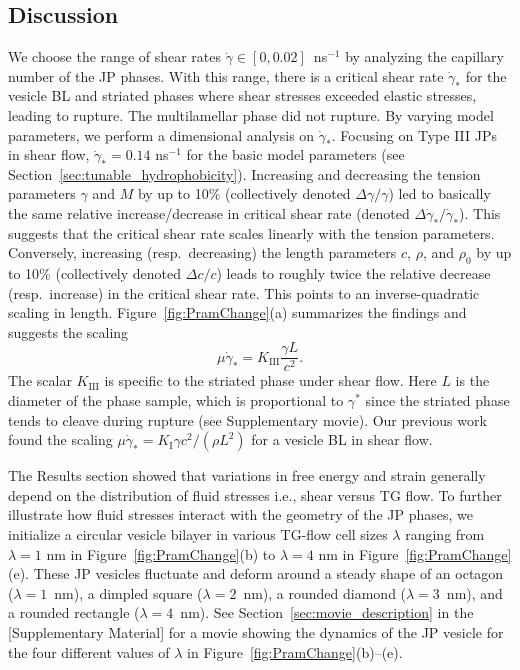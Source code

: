 \documentclass[prb,preprint,showpacs,preprintnumbers,amsmath,amssymb,longbibliography]{revtex4-2}
\begin{document}
\subsection{Discussion}
We choose the range of shear rates $\dot \gamma \in [0, 0.02]$~ns$^{-1}$
by analyzing the capillary number of the JP phases. With this range,
there is a critical shear rate $\dot \gamma_*$ for the vesicle BL and
striated phases where shear stresses exceeded elastic stresses, leading
to rupture. The multilamellar phase did not rupture. By varying model
parameters, we perform a dimensional analysis on $\dot \gamma_*$.
Focusing on Type III JPs in shear flow, $\dot \gamma_* = 0.14$ ns$^{-1}$
for the basic model parameters (see
Section~\ref{sec:tunable_hydrophobicity}). Increasing and decreasing the
tension parameters $\gamma$ and $M$ by up to 10\% (collectively denoted
$\Delta \gamma/\gamma$) led to basically the same relative
increase/decrease in critical shear rate (denoted $\Delta \dot
\gamma_*/\dot \gamma_*$). This suggests that the critical shear rate
scales linearly with the tension parameters. Conversely, increasing
(resp.~decreasing) the length parameters $c$, $\rho$, and $\rho_0$ by up
to 10\% (collectively denoted $\Delta c/c$) leads to roughly twice the
relative decrease (resp.~increase) in the critical shear rate. This
points to an inverse-quadratic scaling in length.
Figure~\ref{fig:PramChange}(a) summarizes the findings and suggests the
scaling
\begin{equation}
\label{eq:CSR}
\mu \dot\gamma_* = K_{\text{III}} \frac{\gamma L}{c^2}.
\end{equation}
The scalar $K_{\text{III}}$ is specific to the striated phase under
shear flow. Here $L$ is the diameter of the phase sample, which is
proportional to $\gamma^*$ since the striated phase tends to cleave
during rupture (see Supplementary movie). Our previous
work~\cite{Fu2022_JFM} found the scaling $\mu \dot\gamma_* =
K_{\text{I}} \gamma c^2/(\rho L^2)$ for a vesicle BL in shear flow.

The Results section showed that variations in free energy and strain
generally depend on the distribution of fluid stresses i.e., shear
versus TG flow. To further illustrate how fluid stresses interact with
the geometry of the JP phases, we initialize a circular vesicle bilayer
in various TG-flow cell sizes $\lambda$ ranging from $\lambda=1$ nm in
Figure~\ref{fig:PramChange}(b) to $\lambda=4$ nm in
Figure~\ref{fig:PramChange}(e).
These JP vesicles fluctuate and deform around a steady shape of an
octagon ($\lambda=1$~nm), a dimpled square ($\lambda=2$~nm), a rounded
diamond ($\lambda=3$~nm), and a rounded rectangle ($\lambda=4$~nm). See
Section~\ref{sec:movie_description} in the [Supplementary Material] for
a movie showing the dynamics of the JP vesicle for the four different
values of $\lambda$ in Figure~\ref{fig:PramChange}(b)--(e).
\end{document}
